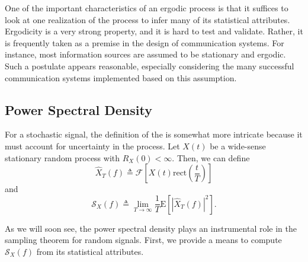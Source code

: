 One of the important characteristics of an ergodic process is that it suffices to look at one realization of the process to infer many of its statistical attributes.
Ergodicity is a very strong property, and it is hard to test and validate.
Rather, it is frequently taken as a premise in the design of communication systems.
For instance, most information sources are assumed to be stationary and ergodic.
Such a postulate appears reasonable, especially considering the many successful communication systems implemented based on this assumption.


\subsection{Power Spectral Density}

For a stochastic signal, the definition of the  is somewhat more intricate because it must account for uncertainty in the process.
Let $X(t)$ be a wide-sense stationary random process with $R_X(0) < \infty$.
Then, we can define
\begin{equation*}
\hat{X}_T(f) \triangleq \mathcal{F} \left[ X(t) \mathrm{rect} \left( \frac{t}{T} \right) \right] 
\end{equation*}
and
\begin{equation*}
\mathcal{S}_X(f) \triangleq \lim_{T \rightarrow \infty} \frac{1}{T} \mathrm{E} \left[ |\hat{X}_T(f)|^2 \right] .
\end{equation*}

As we will soon see, the power spectral density plays an instrumental role in the sampling theorem for random signals.
First, we provide a means to compute $\mathcal{S}_X(f)$ from its statistical attributes.

